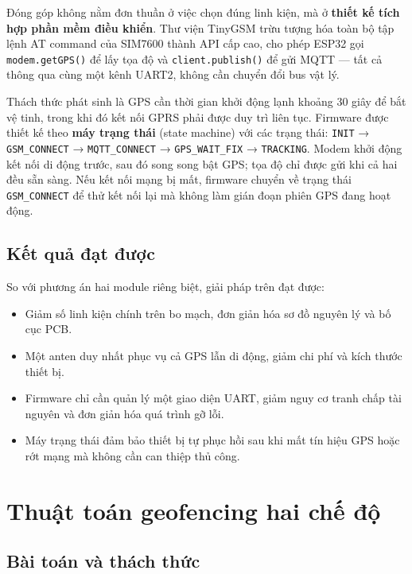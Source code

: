 \documentclass[../DoAn.tex]{subfiles}
\begin{document}
Đóng góp không nằm đơn thuần ở việc chọn đúng linh kiện, mà ở \textbf{thiết kế tích hợp phần mềm điều khiển}. Thư viện TinyGSM trừu tượng hóa toàn bộ tập lệnh AT command của SIM7600 thành API cấp cao, cho phép ESP32 gọi \texttt{modem.getGPS()} để lấy tọa độ và \texttt{client.publish()} để gửi MQTT — tất cả thông qua cùng một kênh UART2, không cần chuyển đổi bus vật lý.

Thách thức phát sinh là GPS cần thời gian khởi động lạnh khoảng 30 giây để bắt vệ tinh, trong khi đó kết nối GPRS phải được duy trì liên tục. Firmware được thiết kế theo \textbf{máy trạng thái} (state machine) với các trạng thái: \texttt{INIT} → \texttt{GSM\_CONNECT} → \texttt{MQTT\_CONNECT} → \texttt{GPS\_WAIT\_FIX} → \texttt{TRACKING}. Modem khởi động kết nối di động trước, sau đó song song bật GPS; tọa độ chỉ được gửi khi cả hai đều sẵn sàng. Nếu kết nối mạng bị mất, firmware chuyển về trạng thái \texttt{GSM\_CONNECT} để thử kết nối lại mà không làm gián đoạn phiên GPS đang hoạt động.

\subsection{Kết quả đạt được}

So với phương án hai module riêng biệt, giải pháp trên đạt được:
\begin{itemize}
    \item Giảm số linh kiện chính trên bo mạch, đơn giản hóa sơ đồ nguyên lý và bố cục PCB.
    \item Một anten duy nhất phục vụ cả GPS lẫn di động, giảm chi phí và kích thước thiết bị.
    \item Firmware chỉ cần quản lý một giao diện UART, giảm nguy cơ tranh chấp tài nguyên và đơn giản hóa quá trình gỡ lỗi.
    \item Máy trạng thái đảm bảo thiết bị tự phục hồi sau khi mất tín hiệu GPS hoặc rớt mạng mà không cần can thiệp thủ công.
\end{itemize}

\section{Thuật toán geofencing hai chế độ}
\label{section:5.2}

\subsection{Bài toán và thách thức}
\end{document}
